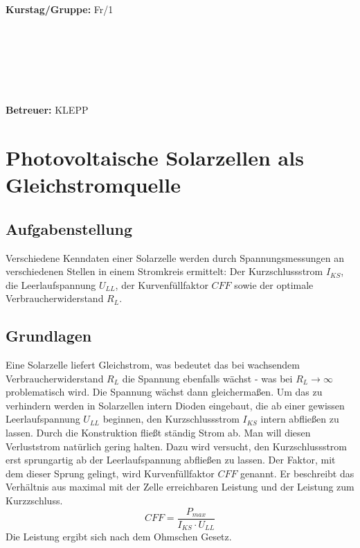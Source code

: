 \documentclass{article}
\begin{document}
\begin{verbatim}


\end{verbatim}
			\begin{flushleft}
			\textbf{\Large{Kurstag/Gruppe:}} \Large{Fr/1}
			\end{flushleft}

\begin{verbatim}






\end{verbatim}
			\begin{flushleft}
			\LARGE{\textbf{Betreuer:}}	\Large{KLEPP}	
			\end{flushleft}
\newpage	

\section{Photovoltaische Solarzellen als Gleichstromquelle}

\subsection{Aufgabenstellung}
Verschiedene Kenndaten einer Solarzelle werden durch Spannungsmessungen an verschiedenen Stellen in einem Stromkreis ermittelt: Der Kurzschlussstrom $I_{KS}$, die Leerlaufspannung $U_{LL}$, der Kurvenfüllfaktor $CFF$ sowie der optimale Verbraucherwiderstand $R_L$.
\subsection{Grundlagen}
Eine Solarzelle liefert Gleichstrom, was bedeutet das bei wachsendem Verbraucherwiderstand $R_L$ die Spannung ebenfalls wächst - was bei $R_L \rightarrow \infty$ problematisch wird. Die Spannung wächst dann gleichermaßen. Um das zu verhindern werden in Solarzellen intern Dioden eingebaut, die ab einer gewissen Leerlaufspannung $U_{LL}$ beginnen, den Kurzschlussstrom $I_{KS}$ intern abfließen zu lassen. Durch die Konstruktion fließt ständig Strom ab. Man will diesen Verluststrom natürlich gering halten. Dazu wird versucht, den Kurzschlussstrom erst sprungartig ab der Leerlaufspannung abfließen zu lassen. Der Faktor, mit dem dieser Sprung gelingt, wird Kurvenfüllfaktor $CFF$ genannt. Er beschreibt das Verhältnis aus maximal mit der Zelle erreichbaren Leistung und der Leistung zum Kurzzschluss.\\
\begin{equation}
\label{Kurvenfaktor}
CFF=\frac{P_{max}}{I_{KS}\cdot U_{LL}}
\end{equation}
Die Leistung ergibt sich nach dem Ohmschen Gesetz. 
\end{document}
